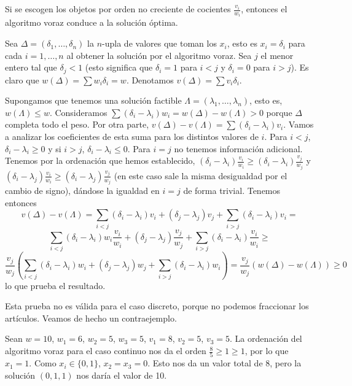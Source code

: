 \documentclass[AL.tex]{subfiles}
\begin{document}
\begin{teorema}
Si se escogen los objetos por orden no creciente de cocientes $\frac{v_i}{w_i}$, entonces el algoritmo voraz conduce a la solución óptima.
\end{teorema}
\begin{dem}
Sea $\Delta=(\delta_1,\dots, \delta_n)$ la $n$-upla de valores que toman los $x_i$, esto es $x_i=\delta_i$ para cada $i=1,\dots, n$ al obtener la solución por el algoritmo voraz. Sea $j$ el menor entero tal que $\delta_j<1$ (esto significa que $\delta_i=1$ para $i<j$ y $\delta_i=0$ para $i>j$). Es claro que $w(\Delta)=\sum w_i\delta_i=w$. Denotamos $v(\Delta)=\sum v_i\delta_i$. 

Supongamos que tenemos una solución factible $\Lambda=(\lambda_1,\dots,\lambda_n)$, esto es, $w(\Lambda)\leq w$. Consideramos $\sum(\delta_i-\lambda_i)w_i=w(\Delta)-w(\Lambda)>0$ porque $\Delta$ completa todo el peso. Por otra parte, $v(\Delta)-v(\Lambda)=\sum(\delta_i-\lambda_i)v_i$. Vamos a analizar los coeficientes de esta suma para los distintos valores de $i$. Para $i<j$, $\delta_i-\lambda_i\geq 0$ y si $i>j$, $\delta_i-\lambda_i\leq 0$. Para $i=j$ no tenemos información adicional. Tenemos por la ordenación que hemos establecido, $(\delta_i-\lambda_i)\frac{v_i}{w_i}\geq (\delta_i-\lambda_i)\frac{v_j}{w_j}$ y $(\delta_i-\lambda_j)\frac{v_i}{w_i}\geq (\delta_i-\lambda_j)\frac{v_j}{w_j}$ (en este caso sale la misma desigualdad por el cambio de signo), dándose la igualdad en $i=j$ de forma trivial. Tenemos entonces
\[
v(\Delta)-v(\Lambda)=\sum_{i<j}(\delta_i-\lambda_i)v_i+(\delta_j-\lambda_j)v_j+\sum_{i>j}(\delta_i-\lambda_i)v_i=
\]
\[
\sum_{i<j}(\delta_i-\lambda_i)w_i\frac{v_i}{w_i}+(\delta_j-\lambda_j)\frac{v_j}{w_j}+\sum_{i>j}(\delta_i-\lambda_i)\frac{v_i}{w_i}\geq
\]
\[
\frac{v_j}{w_j}\left(\sum_{i<j}(\delta_i-\lambda_i)w_i+(\delta_j-\lambda_j)w_j+\sum_{i>j}(\delta_i-\lambda_i)w_i\right)=\frac{v_j}{w_j}(w(\Delta)-w(\Lambda))\geq 0
\]
lo que prueba el resultado. 
\end{dem}
Esta prueba no es válida para el caso discreto, porque no podemos fraccionar los artículos. Veamos de hecho un contraejemplo. 

\begin{ej}
Sean $w=10$, $w_1=6$, $w_2=5$, $w_3=5$, $v_1=8$, $v_2=5$, $v_3=5$. La ordenación del algoritmo voraz para el caso continuo nos da el orden $\frac{8}{5}\geq 1\geq 1$, por lo que $x_1=1$. Como $x_i\in\{0,1\}$, $x_2=x_3=0$. Esto nos da un valor total de 8, pero la solución $(0,1,1)$ nos daría el valor de 10. 
\end{ej}
\end{document}
